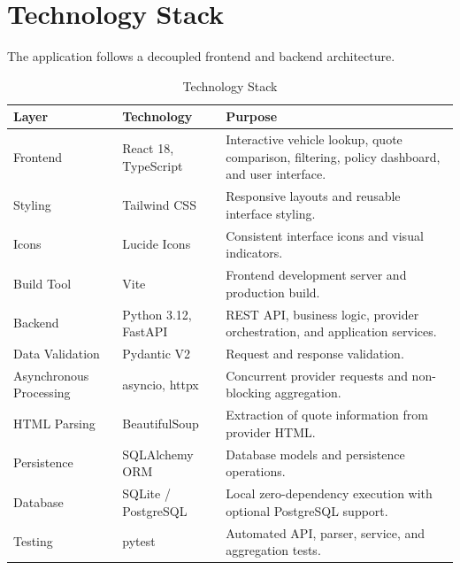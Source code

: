\documentclass[11pt,a4paper]{article}
\begin{document}

\section{Technology Stack}

The application follows a decoupled frontend and backend architecture.

\begin{table}[H]
\centering
\caption{Technology Stack}
\begin{tabularx}{\textwidth}{L{3.2cm}L{3.5cm}Y}
\toprule
\textbf{Layer} & \textbf{Technology} & \textbf{Purpose} \\
\midrule

Frontend &
React 18, TypeScript &
Interactive vehicle lookup, quote comparison, filtering,
policy dashboard, and user interface. \\

Styling &
Tailwind CSS &
Responsive layouts and reusable interface styling. \\

Icons &
Lucide Icons &
Consistent interface icons and visual indicators. \\

Build Tool &
Vite &
Frontend development server and production build. \\

Backend &
Python 3.12, FastAPI &
REST API, business logic, provider orchestration,
and application services. \\

Data Validation &
Pydantic V2 &
Request and response validation. \\

Asynchronous Processing &
asyncio, httpx &
Concurrent provider requests and non-blocking aggregation. \\

HTML Parsing &
BeautifulSoup &
Extraction of quote information from provider HTML. \\

Persistence &
SQLAlchemy ORM &
Database models and persistence operations. \\

Database &
SQLite / PostgreSQL &
Local zero-dependency execution with optional PostgreSQL support. \\

Testing &
pytest &
Automated API, parser, service, and aggregation tests. \\

\bottomrule
\end{tabularx}
\end{table}
\end{document}
